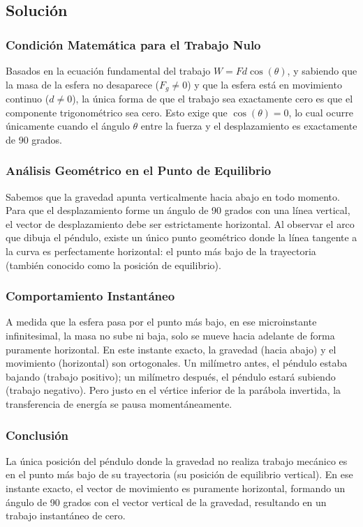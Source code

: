 \documentclass[a4paper,12pt]{article}
\begin{document}
\subsection*{Solución}

\subsubsection*{Condición Matemática para el Trabajo Nulo}
Basados en la ecuación fundamental del trabajo $W = F d \cos(\theta)$, y sabiendo que la masa de la esfera no desaparece ($F_g \neq 0$) y que la esfera está en movimiento continuo ($d \neq 0$), la única forma de que el trabajo sea exactamente cero es que el componente trigonométrico sea cero. Esto exige que $\cos(\theta) = 0$, lo cual ocurre únicamente cuando el ángulo $\theta$ entre la fuerza y el desplazamiento es exactamente de 90 grados.

\subsubsection*{Análisis Geométrico en el Punto de Equilibrio}
Sabemos que la gravedad apunta verticalmente hacia abajo en todo momento. Para que el desplazamiento forme un ángulo de 90 grados con una línea vertical, el vector de desplazamiento debe ser estrictamente horizontal. 
Al observar el arco que dibuja el péndulo, existe un único punto geométrico donde la línea tangente a la curva es perfectamente horizontal: el punto más bajo de la trayectoria (también conocido como la posición de equilibrio). 

\subsubsection*{Comportamiento Instantáneo}
A medida que la esfera pasa por el punto más bajo, en ese microinstante infinitesimal, la masa no sube ni baja, solo se mueve hacia adelante de forma puramente horizontal. En este instante exacto, la gravedad (hacia abajo) y el movimiento (horizontal) son ortogonales. Un milímetro antes, el péndulo estaba bajando (trabajo positivo); un milímetro después, el péndulo estará subiendo (trabajo negativo). Pero justo en el vértice inferior de la parábola invertida, la transferencia de energía se pausa momentáneamente.

\subsubsection*{Conclusión}
La única posición del péndulo donde la gravedad no realiza trabajo mecánico es en el punto más bajo de su trayectoria (su posición de equilibrio vertical). En ese instante exacto, el vector de movimiento es puramente horizontal, formando un ángulo de 90 grados con el vector vertical de la gravedad, resultando en un trabajo instantáneo de cero.
\end{document}

